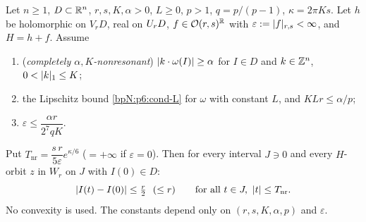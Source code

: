\begin{proposition}\label{bpN:p7:nonresonant}
Let $n\ge1$, $D\subset\mathbb{R}^n$, $r,s,K,\alpha>0$, $L\ge0$, $p>1$, $q=p/(p-1)$, $\kappa=2\pi Ks$. Let $h$ be holomorphic on $V_rD$, real on $U_{r}D$, $f\in\mathcal O(r,s)^{\mathbb{R}}$ with $\varepsilon:=\lvert f\rvert_{r,s}<\infty$, and $H=h+f$. Assume
\begin{enumerate}[label=(\roman*)]
\item (\emph{completely $\alpha,K$-nonresonant}) $\lvert k\cdot\omega(I)\rvert\ge\alpha$ for $I\in D$ and $k\in\mathbb{Z}^n$, $0<\lvert k\rvert_1\le K$;
\item the Lipschitz bound \ref{bpN:p6:cond-L} for $\omega$ with constant $L$, and $KLr\le\alpha/p$;
\item $\varepsilon\le\dfrac{\alpha r}{2^7qK}$.
\end{enumerate}
Put $T_{\mathrm{nr}}=\dfrac{s\,r}{5\varepsilon}e^{\kappa/6}$ ($=+\infty$ if $\varepsilon=0$). Then for every interval $J\ni0$ and every $H$-orbit $z$ in $W_r$ on $J$ with $I(0)\in D$:
\[\lvert I(t)-I(0)\rvert\le\tfrac r2\ \ (\le r)\qquad\text{for all }t\in J,\ \lvert t\rvert\le T_{\mathrm{nr}}.\]
No convexity is used. The constants depend only on $(r,s,K,\alpha,p)$ and $\varepsilon$.
\end{proposition}
